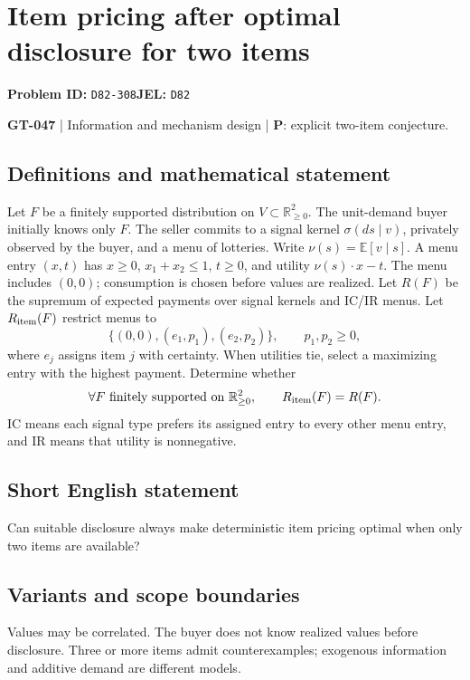 \documentclass[11pt,a4paper]{article}
\begin{document}
\section*{Item pricing after optimal disclosure for two items}
\textbf{Problem ID:} \texttt{D82-308}\quad \textbf{JEL:} \texttt{D82}\par
\label{problem:OP-0177}
\label{game:GT-047}
{\sffamily\small\color{muted}
\textbf{GT-047} | Information and mechanism design | \textbf{P}: explicit two-item conjecture.
\par}
\subsection*{Definitions and mathematical statement}
Let $F$ be a finitely supported distribution on $V\subset\mathbb R_{\geq0}^2$. The unit-demand buyer initially knows only $F$. The seller commits to a signal kernel $\sigma(ds\mid v)$, privately observed by the buyer, and a menu of lotteries. Write $\nu(s)=\mathbb E[v\mid s]$. A menu entry $(x,t)$ has $x\geq0$, $x_1+x_2\leq1$, $t\geq0$, and utility $\nu(s)\cdot x-t$. The menu includes $(0,0)$; consumption is chosen before values are realized. Let $R(F)$ be the supremum of expected payments over signal kernels and IC/IR menus. Let $R_{\rm item}(F)$ restrict menus to
\[
 \{(0,0),(e_1,p_1),(e_2,p_2)\},\qquad p_1,p_2\geq0,
\]
where $e_j$ assigns item $j$ with certainty. When utilities tie, select a maximizing entry with the highest payment. Determine whether
\[
 \forall F\text{ finitely supported on }\mathbb R_{\geq0}^2,\qquad
 R_{\rm item}(F)=R(F).
\]
IC means each signal type prefers its assigned entry to every other menu entry, and IR means that utility is nonnegative.
\subsection*{Short English statement}
Can suitable disclosure always make deterministic item pricing optimal when only two items are available?
\subsection*{Variants and scope boundaries}
Values may be correlated. The buyer does not know realized values before disclosure. Three or more items admit counterexamples; exogenous information and additive demand are different models.
\end{document}
